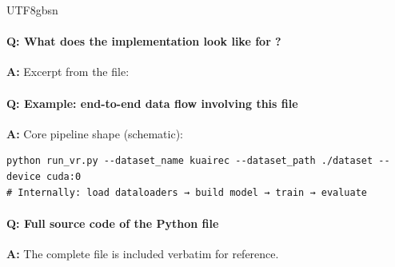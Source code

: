 \documentclass[11pt]{article}
\begin{document}
\begin{CJK*}{UTF8}{gbsn}
\paragraph{Q: What does the implementation look like for \texttt{}?}
\textbf{A:} Excerpt from the file:

\vspace{1mm}


\paragraph{Q: Example: end-to-end data flow involving this file}
\textbf{A:} Core pipeline shape (schematic):

\begin{Verbatim}[fontsize=\small]
python run_vr.py --dataset_name kuairec --dataset_path ./dataset --device cuda:0
# Internally: load dataloaders → build model → train → evaluate
\end{Verbatim}

\paragraph{Q: Full source code of the Python file}
\textbf{A:} The complete file is included verbatim for reference.


\end{CJK*}
\end{document}
